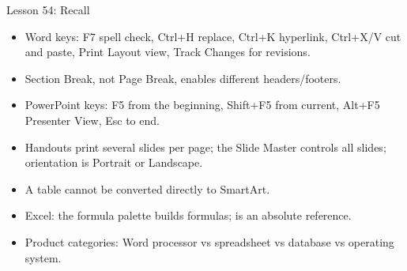 \documentclass[aspectratio=169]{beamer}
\begin{document}
\begin{frame}{Lesson 54: Recall}
  \begin{itemize}
    \item Word keys: F7 spell check, Ctrl+H replace, Ctrl+K hyperlink,
      Ctrl+X/V cut and paste, Print Layout view, Track Changes for revisions.
    \item Section Break, not Page Break, enables different headers/footers.
    \item PowerPoint keys: F5 from the beginning, Shift+F5 from current,
      Alt+F5 Presenter View, Esc to end.
    \item Handouts print several slides per page; the Slide Master controls
      all slides; orientation is Portrait or Landscape.
    \item A table cannot be converted directly to SmartArt.
    \item Excel: the formula palette builds formulas;  is an
      absolute reference.
    \item Product categories: Word processor vs spreadsheet vs database vs
      operating system.
  \end{itemize}
\end{frame}
\end{document}
